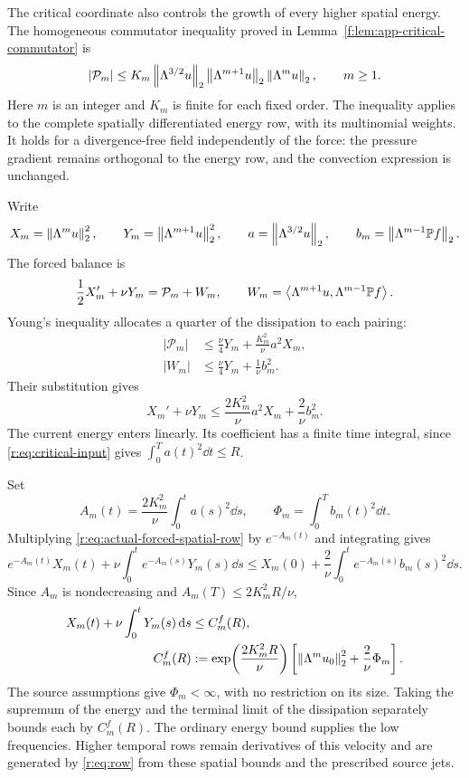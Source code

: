 The critical coordinate also controls the growth of every higher spatial
energy. The homogeneous commutator inequality proved in
Lemma~\ref{f:lem:app-critical-commutator} is
\begin{equation}
 |\mathcal P_m|
 \le K_m\left\lVert \Lambda^{3/2}u\right\rVert_2
          \left\lVert \Lambda^{m+1}u\right\rVert_2\left\lVert \Lambda^mu\right\rVert_2,
 \qquad m\ge1.
 \label{r:eq:actual-spatial-production}
\end{equation}
Here \(m\) is an integer and \(K_m\) is finite for each fixed order.
The inequality applies to the complete spatially differentiated energy
row, with its multinomial weights. It holds for a divergence-free field
independently of the force: the pressure gradient remains orthogonal to
the energy row, and the convection expression is unchanged.

Write
\[
 X_m=\left\lVert \Lambda^mu\right\rVert_2^2,\qquad
 Y_m=\left\lVert \Lambda^{m+1}u\right\rVert_2^2,\qquad
 a=\left\lVert \Lambda^{3/2}u\right\rVert_2,\qquad
 b_m=\left\lVert \Lambda^{m-1}\mathbb P f\right\rVert_2.
\]
The forced balance is
\[
 \frac12X_m'+\nu Y_m=\mathcal P_m+W_m,
 \qquad
 W_m=\left\langle \Lambda^{m+1}u,\Lambda^{m-1}\mathbb P f\right\rangle.
\]
Young's inequality allocates a quarter of the dissipation to each pairing:
\begin{align}
 |\mathcal P_m|
 &\le\frac{\nu}{4}Y_m+\frac{K_m^2}{\nu}a^2X_m,
 \label{r:eq:actual-nonlinear-absorption}\\
 |W_m|&\le\frac{\nu}{4}Y_m+\frac1\nu b_m^2.
 \label{r:eq:actual-source-absorption}
\end{align}
Their substitution gives
\begin{equation}
 X_m'+\nu Y_m
 \le\frac{2K_m^2}{\nu}a^2X_m+\frac2\nu b_m^2.
 \label{r:eq:actual-forced-spatial-row}
\end{equation}
The current energy enters linearly. Its coefficient has a finite time
integral, since \eqref{r:eq:critical-input} gives
\(\int_0^T a(t)^2\dd t\le R\).

Set
\[
 A_m(t)=\frac{2K_m^2}{\nu}\int_0^t a(s)^2\dd s,\qquad
 \Phi_m=\int_0^T b_m(t)^2\dd t.
\]
Multiplying \eqref{r:eq:actual-forced-spatial-row} by \(e^{-A_m(t)}\)
and integrating gives
\[
 e^{-A_m(t)}X_m(t)+\nu\int_0^t e^{-A_m(s)}Y_m(s)\dd s
 \le X_m(0)+\frac2\nu\int_0^t e^{-A_m(s)}b_m(s)^2\dd s.
\]
Since \(A_m\) is nondecreasing and \(A_m(T)\le2K_m^2R/\nu\),
\begin{equation}
 \begin{aligned}
 X_m(t)+\nu\int_0^tY_m(s)\,\mathrm d s
 &\le C_m^f(R),\\
 C_m^f(R)
 &:=\exp\!\left(\frac{2K_m^2R}{\nu}\right)
 \left[\left\lVert \Lambda^mu_0\right\rVert_2^2+\frac2\nu\Phi_m\right].
 \end{aligned}
 \label{r:eq:actual-forced-spatial-bound}
\end{equation}
The source assumptions give \(\Phi_m<\infty\), with no restriction on its
size. Taking the supremum of the energy and the terminal limit of the
dissipation separately bounds each by \(C_m^f(R)\). The ordinary energy
bound supplies the low frequencies. Higher temporal rows remain derivatives
of this velocity and are generated by \eqref{r:eq:row} from these
spatial bounds and the prescribed source jets.

